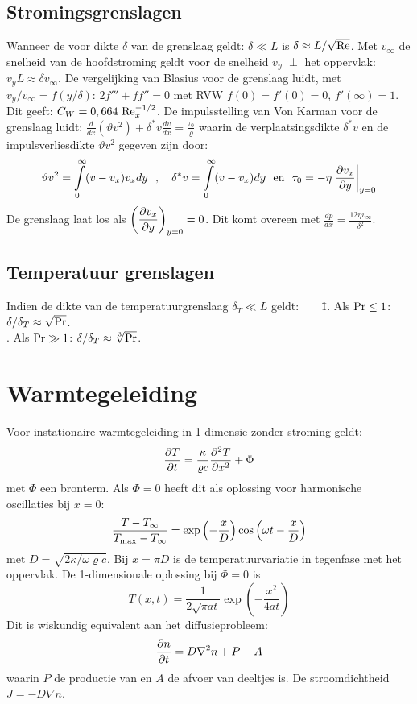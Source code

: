 \subsection{Stromingsgrenslagen}
Wanneer de voor dikte $\delta$ van de grenslaag geldt: $\delta\ll L$ is
$\delta\approx L/\sqrt{\rm Re}$. Met $v_\infty$ de snelheid van de
hoofdstroming geldt voor de snelheid $v_y$ $\perp$ het oppervlak:
$v_yL\approx\delta v_\infty$. De vergelijking van Blasius voor de
grenslaag luidt, met $v_y/v_\infty=f(y/\delta)$: $2f'''+ff''=0$ met RVW
$f(0)=f'(0)=0$, $f'(\infty)=1$. Dit geeft: $C_W=0,664~{\rm Re}_x^{-1/2}$.
\npar
De impulsstelling van Von Karman voor de grenslaag luidt:
$\displaystyle
\frac{d}{dx}(\vartheta v^2)+\delta^* v\frac{dv}{dx}=\frac{\tau_0}{\varrho}
$
\npar
waarin de verplaatsingsdikte $\delta^*v$ en de impulsverliesdikte
$\vartheta v^2$ gegeven zijn door:
\[
\vartheta v^2=\int\limits_0^\infty (v-v_x)v_xdy~~,~~~
\delta^*v=\int\limits_0^\infty (v-v_x)dy~~\mbox{en}~~
\tau_0=-\eta\left.\frac{\partial v_x}{\partial y}\right|_{y=0}
\]
De grenslaag laat los als $\displaystyle\left(\frac{\partial v_x}{\partial y}\right)_{y=0}=0$. Dit komt
overeen met $\displaystyle\frac{dp}{dx}=\frac{12\eta v_\infty}{\delta^2}$.

\subsection{Temperatuur grenslagen}
\begin{tabbing}
Indien de dikte van de temperatuurgrenslaag $\delta_T\ll L$ geldt:~~~~\=
  1. Als ${\rm Pr}\leq1$: $\delta/\delta_T\approx\sqrt{\rm Pr}$.\\
. Als ${\rm Pr}\gg1$: $\delta/\delta_T\approx\sqrt[3]{\rm Pr}$.
\end{tabbing}

\section{Warmtegeleiding}
Voor instationaire warmtegeleiding in 1 dimensie zonder stroming geldt:
\[
\frac{\partial T}{\partial t}=\frac{\kappa}{\varrho c}\frac{\partial^2 T}{\partial x^2}+\Phi
\]
met $\Phi$ een bronterm. Als $\Phi=0$ heeft dit als oplossing voor
harmonische oscillaties bij $x=0$:
\[
\frac{T-T_\infty}{T_{\rm max}-T_\infty}=\exp\left(-\frac{x}{D}\right)\cos\left(\omega t-\frac{x}{D}\right)
\]
met $D=\sqrt{2\kappa/\omega\varrho c}$. Bij $x=\pi D$ is de temperatuurvariatie in
tegenfase met het oppervlak. De 1-dimensionale oplossing bij $\Phi=0$ is
\[
T(x,t)=\frac{1}{2\sqrt{\pi at}}\exp\left(-\frac{x^2}{4at}\right)
\]
Dit is wiskundig equivalent aan het diffusieprobleem:
\[
\frac{\partial n}{\partial t}=D\nabla^2n+P-A
\]
waarin $P$ de productie van en $A$ de afvoer van deeltjes is. De
stroomdichtheid $J=-D\nabla n$.

